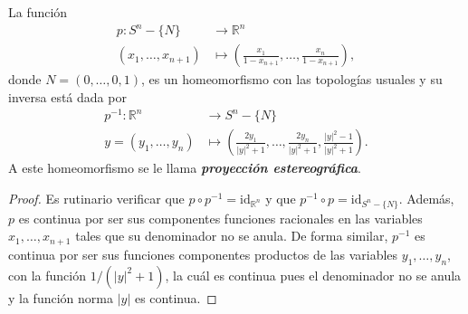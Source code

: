 

\begin{theorem}
La función
\begin{align*}
    p : S^n-\{ N \} & \longrightarrow \mathbb{R}^n \\
    (x_1,\ldots,x_{n+1}) & \longmapsto \left( \frac{x_1}{1-x_{n+1}}, \ldots, \frac{x_n}{1-x_{n+1}} \right),
\end{align*}
donde $N=(0,\ldots,0,1)$, es un homeomorfismo con las topologías usuales y su inversa está dada por
\begin{align*}
    p^{-1} : \mathbb{R}^n & \longrightarrow S^n - \{ N \} \\
    y = (y_1,\ldots,y_n) & \longmapsto \left( \frac{2 y_1}{|y|^2+1}, \ldots, \frac{2 y_n}{|y|^2+1}, \frac{|y|^2-1}{|y|^2+1} \right).
\end{align*}
A este homeomorfismo se le llama \emph{\textbf{proyección estereográfica}}.
\end{theorem}

\begin{proof}
Es rutinario verificar que $p \circ p^{-1} = \text{id}_{\mathbb{R}^n}$ y que $p^{-1} \circ p = \text{id}_{S^n - \{ N \}}$. Además, $p$ es continua por ser sus componentes funciones racionales en las variables $x_1,\ldots,x_{n+1}$ tales que su denominador no se anula. De forma similar, $p^{-1}$ es continua por ser sus funciones componentes productos de las variables $y_1,\ldots,y_n$, con la función $1/(|y|^2+1)$, la cuál es continua pues el denominador no se anula y la función norma $|y|$ es continua.
\end{proof}

